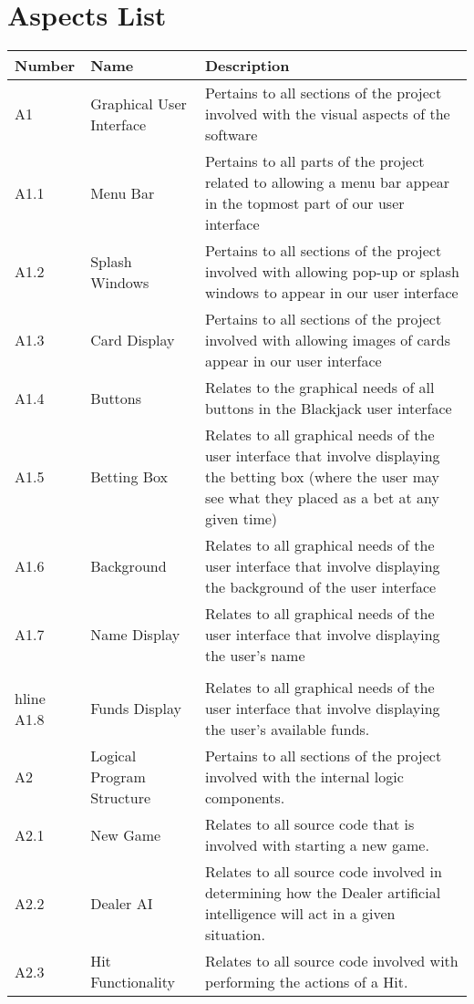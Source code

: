 \documentclass{article}
\newcounter{Aspect}
\begin{document}
\section{Aspects List}
\begin{tabular}{|l|l|p{3.5in}|}\hline Number & Name & Description \\\hline\hline
A1&Graphical User Interface& Pertains to all sections of the project involved with the visual aspects of the software\\\hline 
A1.1&Menu Bar&  Pertains to all parts of the project related to allowing a menu bar appear in the topmost part of our user interface \\\hline
A1.2&Splash Windows &  Pertains to all sections of the project involved with allowing pop-up or splash windows to appear in our user interface \\\hline 
A1.3&Card Display & Pertains to all sections of the project involved with allowing images of cards appear in our user interface\\\hline 
A1.4&Buttons& Relates to the graphical needs of all buttons in the Blackjack user interface \\\hline 
A1.5&Betting Box&  Relates to all graphical needs of the user interface that involve displaying the betting box (where the user may see what they placed as a bet at any given time) \\\hline
A1.6&Background& Relates to all graphical needs of the user interface that involve displaying the background of the user interface \\\hline  
A1.7&Name Display& Relates to all graphical needs of the user interface that involve displaying the user's name\\\\hline 
A1.8&Funds Display&  Relates to all graphical needs of the user interface that involve displaying the user's available funds.  \\\hline 
A2&Logical Program Structure& Pertains to all sections of the project involved with the internal logic components.\\\hline 
A2.1&New Game&  Relates to all source code that is involved with starting a new game.\\\hline 
A2.2&Dealer AI& Relates to all source code involved in determining how the Dealer artificial intelligence will act in a given situation. \\\hline 
A2.3&Hit Functionality&Relates to all source code involved with performing the actions of a Hit. \\\hline 

\end{tabular}
\end{document}
